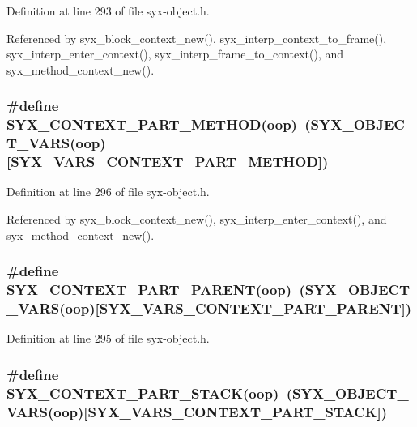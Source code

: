Definition at line 293 of file syx-object.h.

Referenced by syx\_\-block\_\-context\_\-new(), syx\_\-interp\_\-context\_\-to\_\-frame(), syx\_\-interp\_\-enter\_\-context(), syx\_\-interp\_\-frame\_\-to\_\-context(), and syx\_\-method\_\-context\_\-new().\hypertarget{syx-object_8h_df6a9f8fef4d817ec6c930a40a9841bb}{
\subsubsection{\setlength{\rightskip}{0pt plus 5cm}\#define SYX\_\-CONTEXT\_\-PART\_\-METHOD(oop)~(SYX\_\-OBJECT\_\-VARS(oop)\mbox{[}SYX\_\-VARS\_\-CONTEXT\_\-PART\_\-METHOD\mbox{]})}}
\label{syx-object_8h_df6a9f8fef4d817ec6c930a40a9841bb}




Definition at line 296 of file syx-object.h.

Referenced by syx\_\-block\_\-context\_\-new(), syx\_\-interp\_\-enter\_\-context(), and syx\_\-method\_\-context\_\-new().\hypertarget{syx-object_8h_2b5212d0c18b2ba6e55fdec8f33625b8}{
\subsubsection{\setlength{\rightskip}{0pt plus 5cm}\#define SYX\_\-CONTEXT\_\-PART\_\-PARENT(oop)~(SYX\_\-OBJECT\_\-VARS(oop)\mbox{[}SYX\_\-VARS\_\-CONTEXT\_\-PART\_\-PARENT\mbox{]})}}
\label{syx-object_8h_2b5212d0c18b2ba6e55fdec8f33625b8}




Definition at line 295 of file syx-object.h.\hypertarget{syx-object_8h_e749658ddae9b2e6f980f63a2a8cb2f5}{
\subsubsection{\setlength{\rightskip}{0pt plus 5cm}\#define SYX\_\-CONTEXT\_\-PART\_\-STACK(oop)~(SYX\_\-OBJECT\_\-VARS(oop)\mbox{[}SYX\_\-VARS\_\-CONTEXT\_\-PART\_\-STACK\mbox{]})}}
\label{syx-object_8h_e749658ddae9b2e6f980f63a2a8cb2f5}




